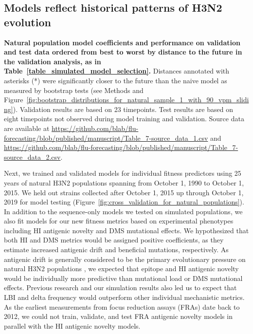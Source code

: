 \subsection{Models reflect historical patterns of H3N2 evolution}

\begin{table}
  \begin{center}
    \scalebox{0.9}{
      
    }
    \caption[{Natural population model coefficients and performance on validation and test data ordered from best to worst by distance to the future in the validation analysis, as in Table~\ref{table_simulated_model_selection}.}]{
      {\bf Natural population model coefficients and performance on validation and test data ordered from best to worst by distance to the future in the validation analysis, as in Table~\ref{table_simulated_model_selection}.}
      Distances annotated with asterisks (*) were significantly closer to the future than the naive model as measured by bootstrap tests (see Methods and Figure~\ref{fig:bootstrap_distributions_for_natural_sample_1_with_90_vpm_sliding}).
      Validation results are based on 23 timepoints.
      Test results are based on eight timepoints not observed during model training and validation.
      Source data are available at \url{https://github.com/blab/flu-forecasting/blob/published/manuscript/Table_7-source_data_1.csv} and \url{https://github.com/blab/flu-forecasting/blob/published/manuscript/Table_7-source_data_2.csv}.
    }
    \label{table_natural_model_selection}
  \end{center}
\end{table}

Next, we trained and validated models for individual fitness predictors using 25 years of natural H3N2 populations spanning from October 1, 1990 to October 1, 2015.
We held out strains collected after October 1, 2015 up through October 1, 2019 for model testing (Figure~\ref{fig:cross_validation_for_natural_populations}).
In addition to the sequence-only models we tested on simulated populations, we also fit models for our new fitness metrics based on experimental phenotypes including HI antigenic novelty and DMS mutational effects.
We hypothesized that both HI and DMS metrics would be assigned positive coefficients, as they estimate increased antigenic drift and beneficial mutations, respectively.
As antigenic drift is generally considered to be the primary evolutionary pressure on natural H3N2 populations \citep{Smith:2004jc,Bedford:2014bf,Luksza:2014hj}, we expected that epitope and HI antigenic novelty would be individually more predictive than mutational load or DMS mutational effects.
Previous research \citep{Neher:2014eu} and our simulation results also led us to expect that LBI and delta frequency would outperform other individual mechanistic metrics.
As the earliest measurements from focus reduction assays (FRAs) date back to 2012, we could not train, validate, and test FRA antigenic novelty models in parallel with the HI antigenic novelty models.

